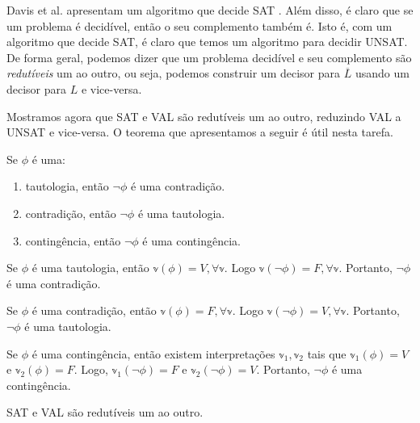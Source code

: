 Davis et al. apresentam um algoritmo que decide SAT \cite{davis1960computing}. Além disso, é claro que se um problema é decidível, então o seu complemento também é. Isto é, com um algoritmo que decide SAT, é claro que temos um algoritmo para decidir UNSAT. De forma geral, podemos dizer que um problema decidível e seu complemento são \emph{redutíveis} um ao outro, ou seja, podemos construir um decisor para $\overline{L}$ usando um decisor para $L$ e vice-versa.

Mostramos agora que SAT e VAL são redutíveis um ao outro, reduzindo VAL a UNSAT e vice-versa. O teorema que apresentamos a seguir é útil nesta tarefa.

\begin{theorem}
	\label{negacoes}
	Se $\phi$ é uma:
	\begin{enumerate}
		\item tautologia, então $\neg \phi$ é uma contradição.
		\item contradição, então $\neg \phi$ é uma tautologia.
		\item contingência, então $\neg \phi$ é uma contingência.
	\end{enumerate}
\end{theorem}

\begin{prova}
Se $\phi$ é uma tautologia, então $\mathbb{v}(\phi) = V, \forall \mathbb{v}$. Logo $\mathbb{v}(\neg \phi) = F, \forall \mathbb{v}$. Portanto, $\neg \phi$ é uma contradição.

Se $\phi$ é uma contradição, então $\mathbb{v}(\phi) = F, \forall \mathbb{v}$. Logo $\mathbb{v}(\neg \phi) = V, \forall \mathbb{v}$. Portanto, $\neg \phi$ é uma tautologia.

Se $\phi$ é uma contingência, então existem interpretações $\mathbb{v}_1,\mathbb{v}_2$ tais que $\mathbb{v}_1(\phi) = V$ e $\mathbb{v}_2(\phi) = F$. Logo, $\mathbb{v}_1(\neg \phi) = F$ e $\mathbb{v}_2(\neg \phi) = V$. Portanto, $\neg \phi$ é uma contingência.
\end{prova}

\begin{theorem}
	\label{satval}
	SAT e VAL são redutíveis um ao outro.
\end{theorem}


